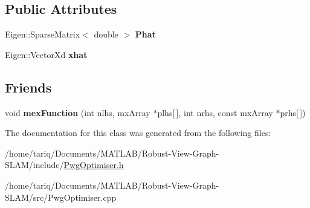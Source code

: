 \subsection*{Public Attributes}
\begin{DoxyCompactItemize}
\item 
Eigen\+::\+Sparse\+Matrix$<$ double $>$ {\bfseries Phat}\hypertarget{classPwgOptimiser_a4cae98998f37bc2806cfd8718b8c01cf}{}\label{classPwgOptimiser_a4cae98998f37bc2806cfd8718b8c01cf}

\item 
Eigen\+::\+Vector\+Xd {\bfseries xhat}\hypertarget{classPwgOptimiser_afb15930580a6bec1b31dd986120c825a}{}\label{classPwgOptimiser_afb15930580a6bec1b31dd986120c825a}

\end{DoxyCompactItemize}
\subsection*{Friends}
\begin{DoxyCompactItemize}
\item 
void {\bfseries mex\+Function} (int nlhs, mx\+Array $\ast$plhs\mbox{[}$\,$\mbox{]}, int nrhs, const mx\+Array $\ast$prhs\mbox{[}$\,$\mbox{]})\hypertarget{classPwgOptimiser_a6a215cbfde54f82a3ce599228fc3fce5}{}\label{classPwgOptimiser_a6a215cbfde54f82a3ce599228fc3fce5}

\end{DoxyCompactItemize}


The documentation for this class was generated from the following files\+:\begin{DoxyCompactItemize}
\item 
/home/tariq/\+Documents/\+M\+A\+T\+L\+A\+B/\+Robust-\/\+View-\/\+Graph-\/\+S\+L\+A\+M/include/\hyperlink{PwgOptimiser_8h}{Pwg\+Optimiser.\+h}\item 
/home/tariq/\+Documents/\+M\+A\+T\+L\+A\+B/\+Robust-\/\+View-\/\+Graph-\/\+S\+L\+A\+M/src/Pwg\+Optimiser.\+cpp\end{DoxyCompactItemize}
